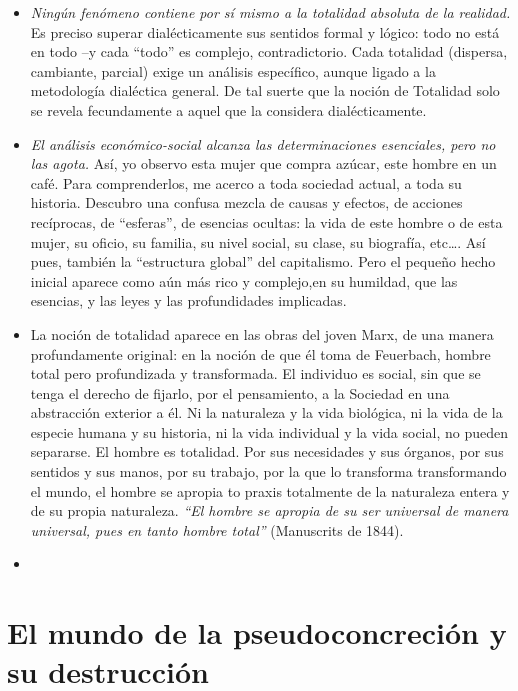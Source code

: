 \documentclass[
  letterpaper,
  DIV=11,
  numbers=noendperiod]{scrreprt}
\begin{document}
\begin{itemize}
\item
  \emph{Ningún fenómeno contiene por sí mismo a la totalidad absoluta de
  la realidad.} Es preciso superar dialécticamente sus sentidos formal y
  lógico: todo no está en todo --y cada ``todo'' es complejo,
  contradictorio. Cada totalidad (dispersa, cambiante, parcial) exige un
  análisis específico, aunque ligado a la metodología dialéctica
  general. De tal suerte que la noción de Totalidad solo se revela
  fecundamente a aquel que la considera dialécticamente.
\item
  \emph{El análisis económico-social alcanza las determinaciones
  esenciales, pero no las agota.} Así, yo observo esta mujer que compra
  azúcar, este hombre en un café. Para comprenderlos, me acerco a toda
  sociedad actual, a toda su historia. Descubro una confusa mezcla de
  causas y efectos, de acciones recíprocas, de ``esferas'', de esencias
  ocultas: la vida de este hombre o de esta mujer, su oficio, su
  familia, su nivel social, su clase, su biografía, etc\ldots. Así pues,
  también la ``estructura global'' del capitalismo. Pero el pequeño
  hecho inicial aparece como aún más rico y complejo,en su humildad, que
  las esencias, y las leyes y las profundidades implicadas.
\item
  La noción de totalidad aparece en las obras del joven Marx, de una
  manera profundamente original: en la noción de que él toma de
  Feuerbach, hombre total pero profundizada y transformada. El individuo
  es social, sin que se tenga el derecho de fijarlo, por el pensamiento,
  a la Sociedad en una abstracción exterior a él. Ni la naturaleza y la
  vida biológica, ni la vida de la especie humana y su historia, ni la
  vida individual y la vida social, no pueden separarse. El hombre es
  totalidad. Por sus necesidades y sus órganos, por sus sentidos y sus
  manos, por su trabajo, por la que lo transforma transformando el
  mundo, el hombre se apropia to praxis totalmente de la naturaleza
  entera y de su propia naturaleza. \emph{``El hombre se apropia de su
  ser universal de manera universal, pues en tanto hombre total''}
  (Manuscrits de 1844).
\item
\end{itemize}

\chapter{El mundo de la pseudoconcreción y su
destrucción}\label{el-mundo-de-la-pseudoconcreciuxf3n-y-su-destrucciuxf3n}
\end{document}
